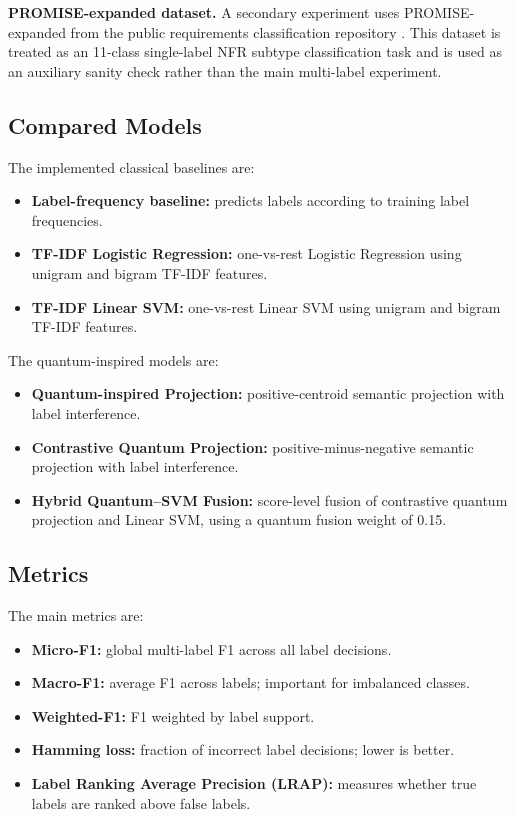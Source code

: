 \documentclass[conference]{IEEEtran}
\begin{document}
\textbf{PROMISE-expanded dataset.} A secondary experiment uses PROMISE-expanded from the public requirements classification repository \cite{mitrevski_promise_exp}. This dataset is treated as an 11-class single-label NFR subtype classification task and is used as an auxiliary sanity check rather than the main multi-label experiment.

\subsection{Compared Models}
The implemented classical baselines are:
\begin{itemize}
    \item \textbf{Label-frequency baseline:} predicts labels according to training label frequencies.
    \item \textbf{TF-IDF Logistic Regression:} one-vs-rest Logistic Regression using unigram and bigram TF-IDF features.
    \item \textbf{TF-IDF Linear SVM:} one-vs-rest Linear SVM using unigram and bigram TF-IDF features.
\end{itemize}

The quantum-inspired models are:
\begin{itemize}
    \item \textbf{Quantum-inspired Projection:} positive-centroid semantic projection with label interference.
    \item \textbf{Contrastive Quantum Projection:} positive-minus-negative semantic projection with label interference.
    \item \textbf{Hybrid Quantum--SVM Fusion:} score-level fusion of contrastive quantum projection and Linear SVM, using a quantum fusion weight of 0.15.
\end{itemize}

\subsection{Metrics}
The main metrics are:
\begin{itemize}
    \item \textbf{Micro-F1:} global multi-label F1 across all label decisions.
    \item \textbf{Macro-F1:} average F1 across labels; important for imbalanced classes.
    \item \textbf{Weighted-F1:} F1 weighted by label support.
    \item \textbf{Hamming loss:} fraction of incorrect label decisions; lower is better.
    \item \textbf{Label Ranking Average Precision (LRAP):} measures whether true labels are ranked above false labels.
\end{itemize}
\end{document}

